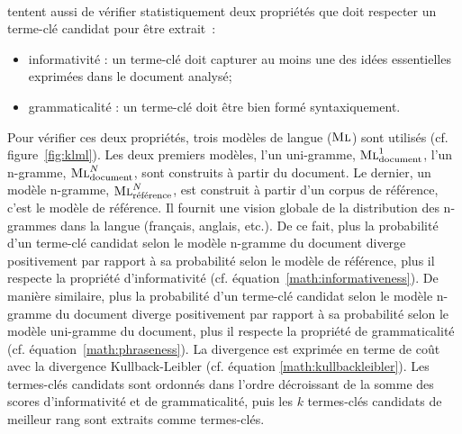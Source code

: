         ~\\ tentent aussi de vérifier
        statistiquement deux propriétés que doit respecter un terme-clé candidat
        pour être extrait~:
        \begin{itemize}
          \item{informativité : un terme-clé doit capturer au moins une des
                idées essentielles exprimées dans le document analysé;}
          \item{grammaticalité : un terme-clé doit être bien formé
                syntaxiquement.}
        \end{itemize}
        Pour vérifier ces deux propriétés, trois modèles de langue
        ($\textsc{Ml}$) sont utilisés (cf. figure~\ref{fig:klml}). Les deux
        premiers modèles, l'un uni-gramme, $\textsc{Ml}_{\text{document}}^1$,
        l'un n-gramme, $\textsc{Ml}_{\text{document}}^N$, sont construits à
        partir du document. Le dernier, un modèle n-gramme,
        $\textsc{Ml}_{\text{référence}}^N$, est construit à partir d'un corpus
        de référence, c'est le modèle de référence. Il fournit une vision
        globale de la distribution des n-grammes dans la langue (français,
        anglais, etc.). De ce fait, plus la probabilité d'un terme-clé candidat
        selon le modèle n-gramme du document diverge positivement par rapport à
        sa probabilité selon le modèle de référence, plus il respecte la
        propriété d'informativité (cf. équation~\ref{math:informativeness}). De
        manière similaire, plus la probabilité d'un terme-clé candidat selon le
        modèle n-gramme du document diverge positivement par rapport à sa
        probabilité selon le modèle uni-gramme du document, plus il respecte la
        propriété de grammaticalité (cf. équation~\ref{math:phraseness}). La
        divergence est exprimée en terme de coût avec la divergence
        Kullback-Leibler (cf. équation \ref{math:kullbackleibler}). Les
        termes-clés candidats sont ordonnés dans l'ordre décroissant de la somme
        des scores d'informativité et de grammaticalité, puis les $k$
        termes-clés candidats de meilleur rang sont extraits comme termes-clés.
